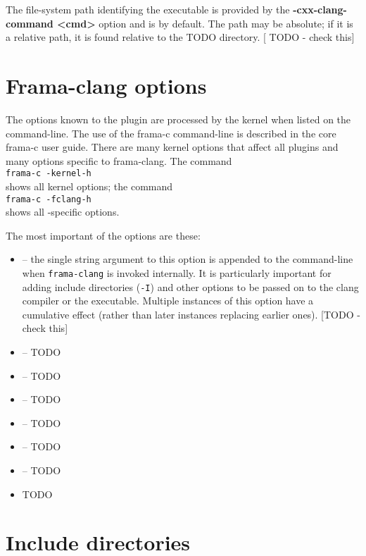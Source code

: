 The file-system path identifying the executable is provided by the \textbf{-cxx-clang-command <cmd>}
option and is \irg by default. The path may be absolute; if it is a relative path, it is found relative to the TODO directory. [ TODO - check this]


\section{Frama-clang options}

The options known to the \fcl plugin are processed by the \fc kernel when listed on the \fc command-line. 
The use of the frama-c command-line is described in the core frama-c 
user guide.
There are many kernel options that affect all plugins and many options specific to frama-clang.
The command \\
\lstinline|frama-c -kernel-h| \\
shows all kernel options; the command\\
\lstinline|frama-c -fclang-h| \\
shows all \fcl-specific options.

The most important of the options are these:
\begin{itemize}
	\item {} -- the single string argument to this option is appended to the command-line when 
	\lstinline|frama-clang| is invoked internally. It is particularly 
	important for adding include directories (\lstinline|-I|) and
	other options to be passed on to the clang compiler or the \irg executable. 
	Multiple instances of this option have a cumulative effect (rather
	than later instances replacing earlier ones). [TODO - check this]
	\item {} -- TODO
	\item {} -- TODO
	\item {} -- TODO
	\item {} -- TODO
	\item {} -- TODO
	\item {} -- TODO
		\item TODO
\end{itemize}

\section{Include directories}


